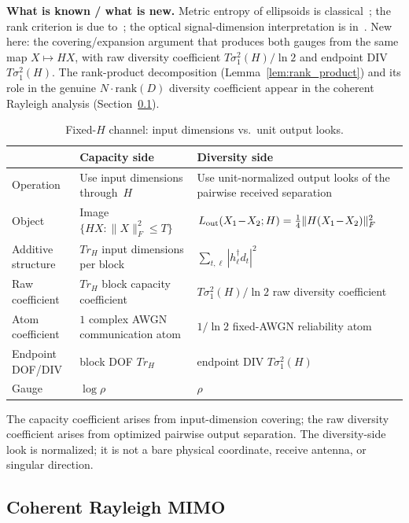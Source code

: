 \documentclass[lettersize,onecolumn]{IEEEtran}
\newcommand{\snr}{\rho}
\begin{document}
\textbf{What is known / what is new.}
Metric entropy of ellipsoids is
classical~\cite{KolmogorovTikhomirov1959}; the rank criterion is due
to~\cite{TarokhSeshadriCalderbank1998}; the optical
signal-dimension interpretation is
in~\cite{PiestunMiller2000,Miller2000}. New here:
the covering/expansion argument that produces both gauges from the
same map $X \mapsto HX$, with raw diversity coefficient
$T\sigma_1^2(H)/\ln 2$ and endpoint DIV
$T\sigma_1^2(H)$. The rank-product decomposition
(Lemma~\ref{lem:rank_product}) and its role in the genuine
$N\!\cdot\!\mathrm{rank}(D)$ diversity coefficient appear in the
coherent Rayleigh analysis (Section~\ref{subsec:ch_coh}).

\begin{table}[t]
\centering
\caption{Fixed-$H$ channel: input dimensions vs.\ unit output looks.}
\label{tab:dof_div_dual}
\small
\begin{tabular}{@{}p{1.8cm}p{3.0cm}p{3.0cm}@{}}
\toprule
& Capacity side & Diversity side \\
\midrule
Operation & Use input dimensions through~$H$ &
Use unit-normalized output looks of the pairwise received separation \\
Object & Image $\{HX : \|X\|_F^2\!\le\!T\}$ &
$L_{\rm out}(X_1\!-\!X_2;H)=\frac14\|H(X_1\!-\!X_2)\|_F^2$ \\
Additive structure & $Tr_H$ input dimensions per block &
$\sum_{t,\ell}|h_\ell^\dagger d_t|^2$ \\
Raw coefficient & $Tr_H$ block capacity coefficient &
$T\sigma_1^2(H)/\!\ln 2$ raw diversity coefficient \\
Atom coefficient & $1$ complex AWGN communication atom &
$1/\ln 2$ fixed-AWGN reliability atom \\
Endpoint DOF/DIV & block DOF $Tr_H$ &
endpoint DIV $T\sigma_1^2(H)$ \\
Gauge & $\log\snr$ & $\snr$ \\
\bottomrule
\end{tabular}

\smallskip
The capacity coefficient arises from input-dimension covering; the
raw diversity coefficient arises from optimized pairwise output
separation. The diversity-side look is normalized; it is not a bare
physical coordinate, receive antenna, or singular direction.
\end{table}

\subsection{Coherent Rayleigh MIMO}\label{subsec:ch_coh}
\end{document}
